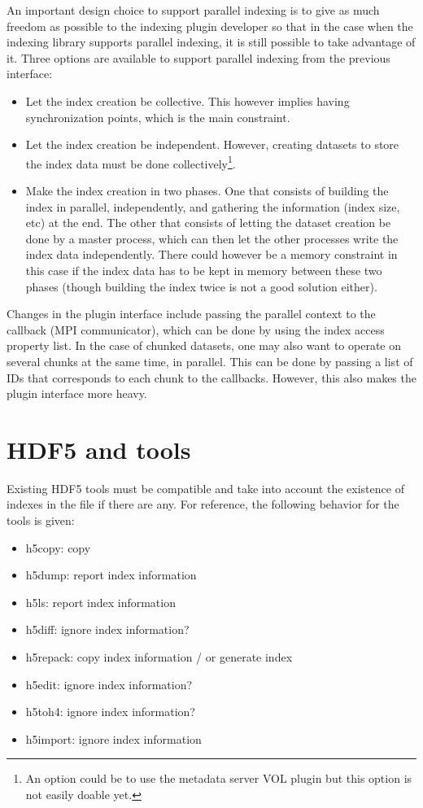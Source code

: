 An important design choice to support parallel indexing is to give as much
freedom as possible to the indexing plugin developer so that in the case when
the indexing library supports parallel indexing, it is still possible to take
advantage of it. Three options are available to support parallel indexing
from the previous interface:
\begin{itemize}
\item Let the index creation be collective. This however implies having synchronization
points, which is the main constraint.
\item Let the index creation be independent. However, creating datasets to
store the index data must be done collectively\footnote{An option could be to use
the metadata server VOL plugin but this option is not easily doable yet.}.
\item Make the index creation in two phases. One that consists of
building the index in parallel, independently, and gathering the information (index size, etc)
at the end. The other that consists of letting the dataset creation be done by a master
process, which can then let the other processes write the index data independently.
There could however be a memory constraint in this case if the index data has to
be kept in memory between these two phases (though building the index twice is not
a good solution either).
\end{itemize}

Changes in the plugin interface include passing the parallel context to the
callback (MPI communicator), which can be done by using the index access property
list.
In the case of chunked datasets, one may also want to operate on several chunks
at the same time, in parallel. This can be done by passing a list of IDs that
corresponds to each chunk to the callbacks. However, this also makes the plugin
interface more heavy.

\section{HDF5 and tools}

Existing HDF5 tools must be compatible and take into account the existence of
indexes in the file if there are any. For reference, the following behavior for
the tools is given:

\begin{itemize}
\item h5copy: copy
\item h5dump: report index information
\item h5ls: report index information
\item h5diff: ignore index information?
\item h5repack: copy index information / or generate index
\item h5edit: ignore index information?
\item h5toh4: ignore index information?
\item h5import: ignore index information
\end{itemize}

